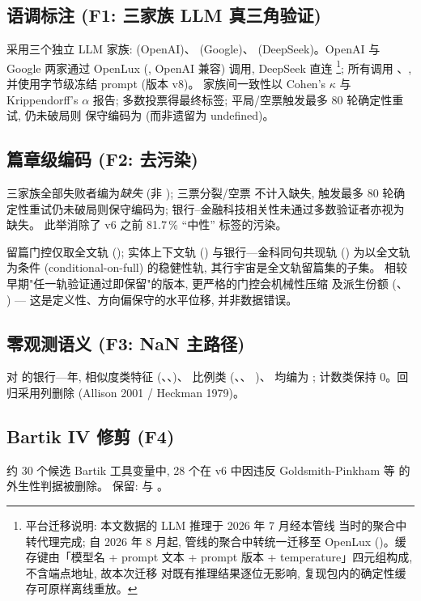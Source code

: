 \subsection{语调标注 (F1: 三家族 LLM 真三角验证)}
采用三个独立 LLM 家族:  (OpenAI)、
 (Google)、
(DeepSeek)。OpenAI 与 Google 两家通过 OpenLux
(, OpenAI 兼容) 调用, DeepSeek 直连
\footnote{平台迁移说明: 本文数据的 LLM 推理于 2026 年 7 月经本管线
当时的聚合中转代理完成; 自 2026 年 8 月起, 管线的聚合中转统一迁移至
OpenLux ()。缓存键由「模型名 + prompt
文本 + prompt 版本 + temperature」四元组构成, 不含端点地址, 故本次迁移
对既有推理结果逐位无影响, 复现包内的确定性缓存可原样离线重放。}; 所有调用 、,
并使用字节级冻结 prompt (版本 v8)。
家族间一致性以 Cohen's $\kappa$ 与 Krippendorff's $\alpha$ 报告;
多数投票得最终标签; 平局/空票触发最多 80 轮确定性重试, 仍未破局则
保守编码为 (而非遗留为 undefined)。

\subsection{篇章级编码 (F2: 去污染)}
三家族全部失败者编为\emph{缺失} (非 ); 三票分裂/空票
不计入缺失, 触发最多 80 轮确定性重试仍未破局则保守编码为;
银行--金融科技相关性未通过多数验证者亦视为缺失。
此举消除了 v6 之前 81.7\,\% ``中性'' 标签的污染。

留篇门控仅取全文轨 (); 实体上下文轨
() 与银行—金科同句共现轨 () 为以全文轨为条件
(conditional-on-full) 的稳健性轨, 其行宇宙是全文轨留篇集的子集。
相较早期"任一轨验证通过即保留"的版本, 更严格的门控会机械性压缩
 及派生份额 (、
) --- 这是定义性、方向偏保守的水平位移,
并非数据错误。

\subsection{零观测语义 (F3: NaN 主路径)}
对  的银行—年, 相似度类特征
(、、)、
比例类 (、、
)、 均编为
; 计数类保持 0。回归采用列删除 (Allison 2001 / Heckman 1979)。

\subsection{Bartik IV 修剪 (F4)}
约 30 个候选 Bartik 工具变量中, 28 个在 v6 中因违反
Goldsmith-Pinkham 等 \parencite{goldsmith2020bartik} 的外生性判据被删除。
保留:  与 。

